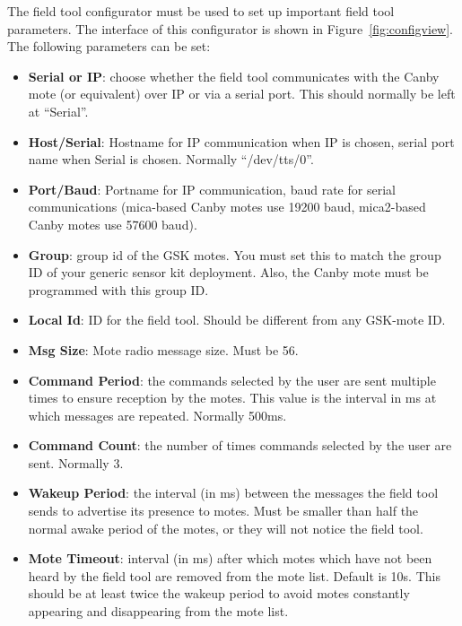 \documentclass{article}
\begin{document}
The field tool configurator must be used to set up important field tool
parameters. The interface of this configurator is shown in Figure~\ref{fig:configview}. The following parameters can be set:
\begin{itemize}
\item {\bf Serial or IP}: choose whether the field tool communicates with
the Canby mote (or equivalent) over IP or via a serial port. This should
normally be left at ``Serial''.

\item {\bf Host/Serial}: Hostname for IP communication when IP is chosen,
serial port name when Serial is chosen. Normally ``/dev/tts/0''.

\item {\bf Port/Baud}: Portname for IP communication, baud rate for serial
communications (mica-based Canby motes use 19200 baud, mica2-based Canby
motes use 57600 baud).

\item {\bf Group}: group id of the GSK motes. You must set this to match
the group ID of your generic sensor kit deployment. Also, the Canby mote
must be programmed with this group ID.

\item {\bf Local Id}: ID for the field tool. Should be different from
any GSK-mote ID.

\item {\bf Msg Size}: Mote radio message size. Must be 56.

\item {\bf Command Period}: the commands selected by the user are sent
multiple times to ensure reception by the motes. This value is the interval 
in ms at which messages are repeated. Normally 500ms.

\item {\bf Command Count}: the number of times commands selected by the user
are sent. Normally 3.

\item {\bf Wakeup Period}: the interval (in ms) between the messages the
field tool sends to advertise its presence to motes. Must be smaller than
half the normal awake period of the motes, or they will not notice the
field tool.

\item {\bf Mote Timeout}: interval (in ms) after which motes which have not
been heard by the field tool are removed from the mote list. Default is 10s.
This should be at least twice the wakeup period to avoid motes constantly
appearing and disappearing from the mote list.

\end{itemize}
\end{document}
